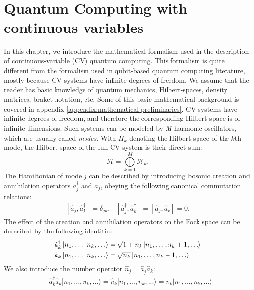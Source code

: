 \documentclass[12pt, a4paper,  nobibnotes]{article}
\newcommand{\op}[1]{\hat{#1}}
\begin{document}
\section{Quantum Computing with continuous variables}
In this chapter, we introduce the mathematical formalism used in the description of 
continuous-variable (CV) quantum computing. This formalism is quite different from the 
formalism used in qubit-based quantum computing literature, mostly because
CV systems have infinite degrees of freedom. 
We assume that the reader has basic knowledge of quantum mechanics, Hilbert-spaces, density
matrices, braket notation, etc. Some of this basic mathematical background is covered in appendix
\ref{appendix:mathematical-preliminaries}. 
CV systems have infinite degrees of freedom, and therefore the corresponding Hilbert-space is of infinite dimensions. 
Such systems can be modeled by $M$ harmonic oscillators, which are usually called \textit{modes}. 
With $H_k$ denoting the Hilbert-space of the $k$th mode, the Hilbert-space of the full CV system is their direct sum:
\begin{equation}
    \mathcal H = \bigoplus\limits_{k=1}^M\mathcal H_k.
\end{equation}
The Hamiltonian of mode $j$ can be described by introducing bosonic creation and annihilation operators $a_j^\dagger$ and $a_j$, obeying the following canonical commutation relations:
\begin{align}
    \left[\op a_j, \op a_k^\dagger \right] = \delta_{jk}, & \left[\op a_j^\dagger, \op a_k^\dagger\right] = \left[\op a_j, \op a_k\right] = 0.
\end{align}
The effect of the creation and annihilation operators on the Fock space can be described by the 
following identities:
\begin{align}
    \begin{split}
    &\op a_k^{\dagger} \ket{n_1, \dots, n_k, \dots} = \sqrt{1+n_k}\ket{n_1, \dots, n_k + 1, \dots} \\
    &\op a_k \ket{n_1, \dots, n_k, \dots} = \sqrt{n_k} \ket{n_1, \dots, n_k - 1, \dots} \\
    \end{split}
\end{align}
We also introduce the number operator $\op n_j=\op a_j^\dagger \op a_k$:
\begin{align}
 &\op a_k^\dagger \op a_k |n_1, ..., n_k, ... \rangle = \op n_k |n_1, ..., n_k, ... \rangle = n_k |n_1, ..., n_k, ... \rangle
\end{align}
\end{document}
